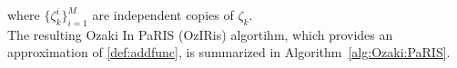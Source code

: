 \documentclass[12pt]{article}
\newcommand{\rmd}{\mathrm{d}}
\newcommand{\eqsp}{\;}
\newcommand{\1}{\mathrm{1}}
\newcommand{\mw}{\mathsf{w}}%
\begin{document}
where $\{\zeta_k^i\}_{i=1}^M$ are independent copies of $\zeta_k$.\\
The resulting Ozaki In PaRIS (OzIRis) algortihm, which provides an approximation of \eqref{def:addfunc}, is summarized in Algorithm~\ref{alg:Ozaki:PaRIS}.%
\end{document}
